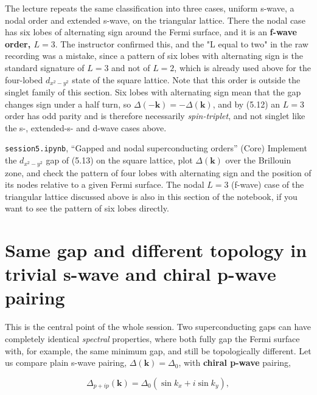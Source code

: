 The lecture repeats the same classification into three cases, uniform s-wave, a nodal order and
extended s-wave, on the triangular lattice. There the nodal case has six lobes of alternating sign
around the Fermi surface, and it is an \textbf{f-wave order, $L=3$}. The instructor confirmed this,
and the "L equal to two" in the raw recording was a mistake, since a pattern of six lobes with
alternating sign is the standard signature of $L=3$ and not of $L=2$, which is already used above
for the four-lobed $d_{x^2-y^2}$ state of the square lattice. Note that this order is outside the
singlet family of this section. Six lobes with alternating sign mean that the gap changes sign under
a half turn, so $\Delta(-\mathbf k) =
-\Delta(\mathbf k)$, and by (5.12) an $L=3$ order has odd parity and is therefore necessarily
\emph{spin-triplet}, and not singlet like the s-, extended-s- and d-wave cases above.



\begin{notebookbox}{\texttt{session5.ipynb}, ``Gapped and nodal superconducting orders'' (Core)}
Implement the $d_{x^2-y^2}$ gap of (5.13) on the square lattice, plot $\Delta(\mathbf k)$ over the
Brillouin zone, and check the pattern of four lobes with alternating sign and the position of its
nodes relative to a given Fermi surface. The nodal $L=3$ (f-wave) case of the triangular lattice
discussed above is also in this section of the notebook, if you want to see the pattern of six
lobes directly.
\end{notebookbox}

\section{Same gap and different topology in trivial s-wave and chiral p-wave pairing}

This is the central point of the whole session. Two superconducting gaps can have completely
identical \emph{spectral} properties, where both fully gap the Fermi surface with, for example, the
same minimum gap, and still be topologically different. Let us compare plain s-wave pairing,
$\Delta(\mathbf k) =
\Delta_0$, with \textbf{chiral p-wave} pairing,

\begin{equation}
\Delta_{p+ip}(\mathbf k) = \Delta_0\left(\sin k_x + i \sin k_y\right),
\end{equation}

